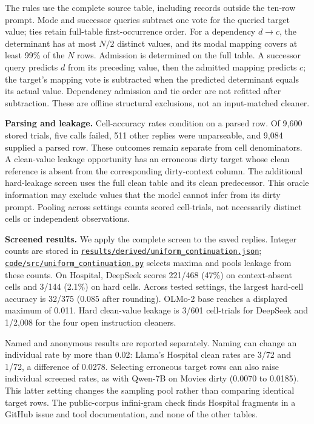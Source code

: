 \documentclass[10pt,a4paper]{article}
\begin{document}
The rules use the complete source table, including records outside the ten-row prompt. Mode and successor queries subtract one vote for the queried target value; ties retain full-table first-occurrence order. For a dependency $d\to c$, the determinant has at most $N/2$ distinct values, and its modal mapping covers at least 99\% of the $N$ rows. Admission is determined on the full table. A successor query predicts $d$ from its preceding value, then the admitted mapping predicts $c$; the target's mapping vote is subtracted when the predicted determinant equals its actual value. Dependency admission and tie order are not refitted after subtraction. These are offline structural exclusions, not an input-matched cleaner.

\textbf{Parsing and leakage.} Cell-accuracy rates condition on a parsed row. Of 9,600 stored trials, five calls failed, 511 other replies were unparseable, and 9,084 supplied a parsed row. These outcomes remain separate from cell denominators. A clean-value leakage opportunity has an erroneous dirty target whose clean reference is absent from the corresponding dirty-context column. The additional hard-leakage screen uses the full clean table and its clean predecessor. This oracle information may exclude values that the model cannot infer from its dirty prompt. Pooling across settings counts scored cell-trials, not necessarily distinct cells or independent observations.

\textbf{Screened results.} We apply the complete screen to the saved replies. Integer counts are stored in \href{https://github.com/hinsonver/CoRe-Benchmark/blob/main/results/derived/uniform_continuation.json}{\nolinkurl{results/derived/uniform_continuation.json}};
\href{https://github.com/hinsonver/CoRe-Benchmark/blob/main/code/src/uniform_continuation.py}{\nolinkurl{code/src/uniform_continuation.py}} selects maxima and pools leakage from these counts. On Hospital, DeepSeek scores 221/468 (47\%) on context-absent cells and 3/144 (2.1\%) on hard cells. Across tested settings, the largest hard-cell accuracy is 32/375 (0.085 after rounding). OLMo-2 base reaches a displayed maximum of 0.011. Hard clean-value leakage is 3/601 cell-trials for DeepSeek and 1/2,008 for the four open instruction cleaners.

Named and anonymous results are reported separately. Naming can change an individual rate by more than 0.02: Llama's Hospital clean rates are 3/72 and 1/72, a difference of 0.0278. Selecting erroneous target rows can also raise individual screened rates, as with Qwen-7B on Movies dirty (0.0070 to 0.0185). This latter setting changes the sampling pool rather than comparing identical target rows. The public-corpus infini-gram check finds Hospital fragments in a GitHub issue and tool documentation, and none of the other tables.
\end{document}
